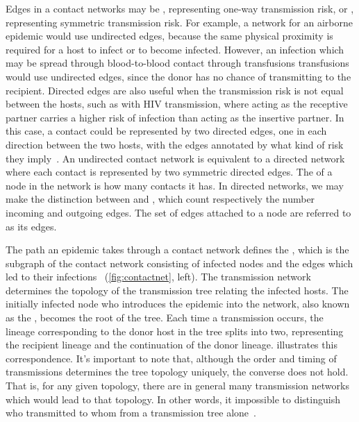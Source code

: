 Edges in a contact networks may be , representing one-way
transmission risk, or , representing symmetric transmission
risk. For example, a network for an airborne epidemic would use undirected
edges, because the same physical proximity is required for a host to infect or
to become infected. However, an infection which may be spread through
blood-to-blood contact through transfusions transfusions would use undirected
edges, since the donor has no chance of transmitting to the recipient. Directed
edges are also useful when the transmission risk is not equal between the
hosts, such as with HIV transmission, where acting as the receptive partner
carries a higher risk of infection than acting as the insertive partner. In
this case, a contact could be represented by two directed edges, one in each
direction between the two hosts, with the edges annotated by what kind of risk
they imply~\autocite{wasserman1994social}. An undirected contact network is
equivalent to a directed network where each contact is represented by two
symmetric directed edges. The  of a node in the network is how
many contacts it has. In directed networks, we may make the distinction between
 and , which count respectively the number
incoming and outgoing edges. The set of edges attached to a node are referred
to as its  edges.

The path an epidemic takes through a contact network defines the
, which is the subgraph of the contact network
consisting of infected nodes and the edges which led to their
infections~\autocite{welch2011statistical} (\cref{fig:contactnet}, left). The
transmission network determines the topology of the transmission tree relating
the infected hosts. The initially infected node who introduces the epidemic
into the network, also known as the , becomes the root of the
tree. Each time a transmission occurs, the lineage corresponding to the donor
host in the tree splits into two, representing the recipient lineage and the
continuation of the donor lineage.  illustrates this
correspondence. It's important to note that, although the order and timing of
transmissions determines the tree topology uniquely, the converse does not
hold. That is, for any given topology, there are in general many transmission
networks which would lead to that topology. In other words, it impossible to
distinguish who transmitted to whom from a transmission tree
alone~\autocite{bernard2007hiv}.


